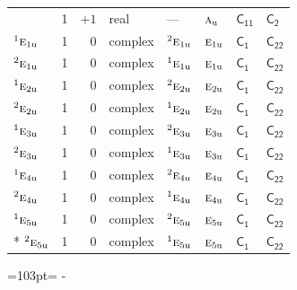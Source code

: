 \documentclass[10pt,a4paper]{article}
\newcommand{\needspace}[1]{\par\penalty-100\begingroup\dimen0=#1\relax\dimen2=\pagegoal
  \advance\dimen2-\pagetotal\ifdim\dimen0>\dimen2\relax\ifdim\dimen2>0pt\vfil\break\fi\fi
  \endgroup}
\numberwithin{equation}{section}
\newcommand{\grp}[1]{\mathsf{#1}}
\newcommand{\irr}[1]{\text{\normalfont\scshape #1}}
\newcommand{\conjpair}[1]{{}^{#1}}
\newcommand{\detbox}[1]{{\setlength{\fboxsep}{1pt}\fbox{#1}}}
\newcommand{\ptag}[1]{\mathrm{#1}}
\begin{document}
{\begin{longtable}{@{}lrrlllll@{}}
\detbox{$\irr{a}_{\ptag{u}}$} & 1 & $+1$ & real & --- & $\irr{a}_{\ptag{u}}$ & \href{C11.pdf}{$\grp{C_{11}}$} & \href{C2.pdf}{$\grp{C_{2}}$}\\
$\conjpair{1}\irr{e}_{1\ptag{u}}$ & 1 & $0$ & complex & $\conjpair{2}\irr{e}_{1\ptag{u}}$ & $\irr{e}_{1\ptag{u}}$ & \href{C1.pdf}{$\grp{C_{1}}$} & $\grp{C_{22}}$\\
$\conjpair{2}\irr{e}_{1\ptag{u}}$ & 1 & $0$ & complex & $\conjpair{1}\irr{e}_{1\ptag{u}}$ & $\irr{e}_{1\ptag{u}}$ & \href{C1.pdf}{$\grp{C_{1}}$} & $\grp{C_{22}}$\\
$\conjpair{1}\irr{e}_{2\ptag{u}}$ & 1 & $0$ & complex & $\conjpair{2}\irr{e}_{2\ptag{u}}$ & $\irr{e}_{2\ptag{u}}$ & \href{C1.pdf}{$\grp{C_{1}}$} & $\grp{C_{22}}$\\
$\conjpair{2}\irr{e}_{2\ptag{u}}$ & 1 & $0$ & complex & $\conjpair{1}\irr{e}_{2\ptag{u}}$ & $\irr{e}_{2\ptag{u}}$ & \href{C1.pdf}{$\grp{C_{1}}$} & $\grp{C_{22}}$\\
$\conjpair{1}\irr{e}_{3\ptag{u}}$ & 1 & $0$ & complex & $\conjpair{2}\irr{e}_{3\ptag{u}}$ & $\irr{e}_{3\ptag{u}}$ & \href{C1.pdf}{$\grp{C_{1}}$} & $\grp{C_{22}}$\\
$\conjpair{2}\irr{e}_{3\ptag{u}}$ & 1 & $0$ & complex & $\conjpair{1}\irr{e}_{3\ptag{u}}$ & $\irr{e}_{3\ptag{u}}$ & \href{C1.pdf}{$\grp{C_{1}}$} & $\grp{C_{22}}$\\
$\conjpair{1}\irr{e}_{4\ptag{u}}$ & 1 & $0$ & complex & $\conjpair{2}\irr{e}_{4\ptag{u}}$ & $\irr{e}_{4\ptag{u}}$ & \href{C1.pdf}{$\grp{C_{1}}$} & $\grp{C_{22}}$\\
$\conjpair{2}\irr{e}_{4\ptag{u}}$ & 1 & $0$ & complex & $\conjpair{1}\irr{e}_{4\ptag{u}}$ & $\irr{e}_{4\ptag{u}}$ & \href{C1.pdf}{$\grp{C_{1}}$} & $\grp{C_{22}}$\\
$\conjpair{1}\irr{e}_{5\ptag{u}}$ & 1 & $0$ & complex & $\conjpair{2}\irr{e}_{5\ptag{u}}$ & $\irr{e}_{5\ptag{u}}$ & \href{C1.pdf}{$\grp{C_{1}}$} & $\grp{C_{22}}$\\*
$\conjpair{2}\irr{e}_{5\ptag{u}}$ & 1 & $0$ & complex & $\conjpair{1}\irr{e}_{5\ptag{u}}$ & $\irr{e}_{5\ptag{u}}$ & \href{C1.pdf}{$\grp{C_{1}}$} & $\grp{C_{22}}$\\
\bottomrule\end{longtable}}
\needspace{103pt}
\end{document}
